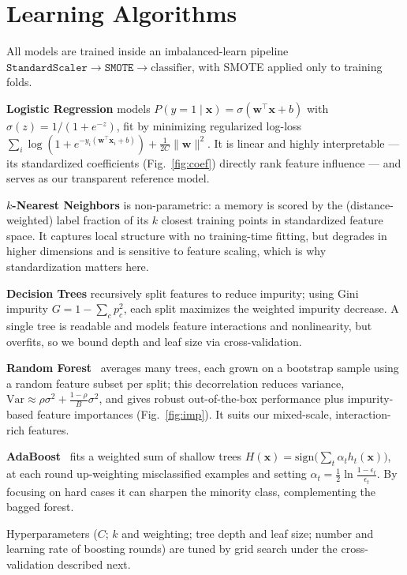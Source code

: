 \documentclass[11pt]{article}
\begin{document}
\section{Learning Algorithms}\label{sec:methods}
All models are trained inside an imbalanced-learn pipeline
$\texttt{StandardScaler}\to\texttt{SMOTE}\to\text{classifier}$, with SMOTE applied
only to training folds.

\textbf{Logistic Regression} models $P(y{=}1\mid\mathbf{x})=\sigma(\mathbf{w}^\top
\mathbf{x}+b)$ with $\sigma(z)=1/(1+e^{-z})$, fit by minimizing regularized log-loss
$\sum_i \log(1+e^{-y_i(\mathbf{w}^\top\mathbf{x}_i+b)})+\tfrac{1}{2C}\lVert\mathbf{w}\rVert^2$.
It is linear and highly interpretable --- its standardized coefficients
(Fig.~\ref{fig:coef}) directly rank feature influence --- and serves as our
transparent reference model.

\textbf{$k$-Nearest Neighbors} is non-parametric: a memory is scored by the
(distance-weighted) label fraction of its $k$ closest training points in
standardized feature space. It captures local structure with no training-time
fitting, but degrades in higher dimensions and is sensitive to feature scaling,
which is why standardization matters here.

\textbf{Decision Trees} recursively split features to reduce impurity; using Gini
impurity $G=1-\sum_c p_c^2$, each split maximizes the weighted impurity decrease.
A single tree is readable and models feature interactions and nonlinearity, but
overfits, so we bound depth and leaf size via cross-validation.

\textbf{Random Forest}~\cite{rf} averages many trees, each grown on a bootstrap
sample using a random feature subset per split; this decorrelation reduces
variance, $\mathrm{Var}\!\approx\!\rho\sigma^2+\frac{1-\rho}{B}\sigma^2$, and gives
robust out-of-the-box performance plus impurity-based feature importances
(Fig.~\ref{fig:imp}). It suits our mixed-scale, interaction-rich features.

\textbf{AdaBoost}~\cite{adaboost} fits a weighted sum of shallow trees
$H(\mathbf{x})=\mathrm{sign}\!\big(\sum_t \alpha_t h_t(\mathbf{x})\big)$, at each
round up-weighting misclassified examples and setting
$\alpha_t=\tfrac12\ln\frac{1-\epsilon_t}{\epsilon_t}$. By focusing on hard cases it
can sharpen the minority class, complementing the bagged forest.

Hyperparameters ($C$; $k$ and weighting; tree depth and leaf size; number and
learning rate of boosting rounds) are tuned by grid search under the
cross-validation described next.
\end{document}
